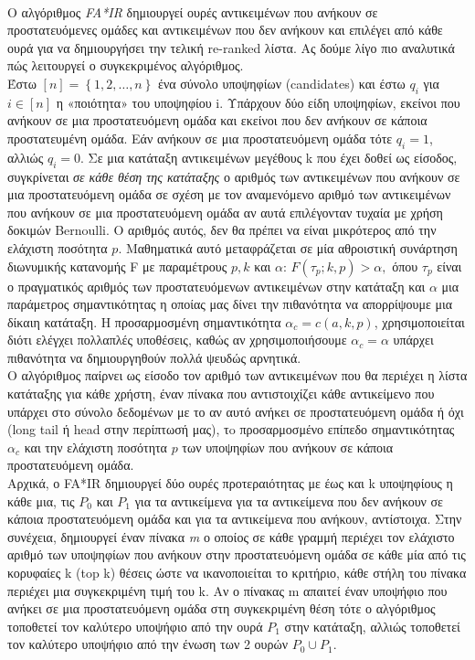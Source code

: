 \\
Ο αλγόριθμος \textit{FA*IR} \cite{zehlikeFAIRFair2017} δημιουργεί ουρές αντικειμένων που ανήκουν σε προστατευόμενες ομάδες και αντικειμένων που δεν ανήκουν και επιλέγει από κάθε ουρά για να δημιουργήσει την τελική re-ranked λίστα. Ας δούμε λίγο πιο αναλυτικά πώς λειτουργεί ο συγκεκριμένος αλγόριθμος.\\ Έστω $ \left[ n \right] =\left\lbrace 1, 2, \dots ,n \right\rbrace  $ ένα σύνολο υποψηφίων (candidates) και έστω $ q_i $ για $ i \in \left[n \right]  $ η «ποιότητα» του υποψηφίου i. Υπάρχουν δύο είδη υποψηφίων, εκείνοι που ανήκουν σε μια προστατευόμενη ομάδα και εκείνοι που δεν ανήκουν σε κάποια προστατευμένη ομάδα. Εάν ανήκουν σε μια προστατευόμενη ομάδα τότε $ q_i = 1 $, αλλιώς  $ q_i = 0 $. Σε μια κατάταξη αντικειμένων μεγέθους k που έχει δοθεί ως είσοδος, συγκρίνεται \textit{σε κάθε θέση της κατάταξης} ο αριθμός των αντικειμένων που ανήκουν σε μια προστατευόμενη ομάδα σε σχέση με τον αναμενόμενο αριθμό των αντικειμένων που ανήκουν σε μια προστατευόμενη ομάδα αν αυτά επιλέγονταν τυχαία με χρήση δοκιμών Bernoulli. Ο αριθμός αυτός, δεν θα πρέπει να είναι μικρότερος από την ελάχιστη ποσότητα $ p $. Μαθηματικά αυτό μεταφράζεται σε μία αθροιστική συνάρτηση διωνυμικής κατανομής F με παραμέτρους $  p, k $ και $ α $:
$ F(\tau _p; k, p) > \alpha , $ όπου $ \tau _p  $ είναι ο πραγματικός αριθμός των προστατευόμενων αντικειμένων στην κατάταξη και $ \alpha $ μια παράμετρος σημαντικότητας η οποίας μας δίνει την πιθανότητα να απορρίψουμε μια δίκαιη κατάταξη. Η προσαρμοσμένη σημαντικότητα $ \alpha_c = c\left(a, k, p \right) $, χρησιμοποιείται διότι ελέγχει πολλαπλές υποθέσεις, καθώς αν χρησιμοποιήσουμε $ \alpha_c = \alpha $ υπάρχει πιθανότητα να δημιουργηθούν πολλά ψευδώς αρνητικά.\\
Ο αλγόριθμος παίρνει ως είσοδο τον αριθμό των αντικειμένων που θα περιέχει η λίστα κατάταξης για κάθε χρήστη, έναν πίνακα που αντιστοιχίζει κάθε αντικείμενο που υπάρχει στο σύνολο δεδομένων με το αν αυτό ανήκει σε προστατευόμενη ομάδα ή όχι (long tail ή head στην περίπτωσή μας), τo προσαρμοσμένο επίπεδο σημαντικότητας $ \alpha_c $ και την ελάχιστη ποσότητα $ p $ των υποψηφίων που ανήκουν σε κάποια προστατευόμενη ομάδα. \\
Αρχικά, ο FA*IR δημιουργεί δύο ουρές προτεραιότητας με έως και k υποψηφίους η κάθε μια, τις $ P_0 $ και $ P_1 $ για τα αντικείμενα για τα αντικείμενα που δεν ανήκουν σε κάποια προστατευόμενη ομάδα και για τα αντικείμενα που ανήκουν, αντίστοιχα. Στην συνέχεια, δημιουργεί έναν πίνακα \textit{m} ο οποίος σε κάθε γραμμή περιέχει τον ελάχιστο αριθμό των υποψηφίων που ανήκουν στην προστατευόμενη ομάδα σε κάθε μία από τις κορυφαίες k (top k) θέσεις ώστε να ικανοποιείται το κριτήριο, κάθε στήλη του πίνακα περιέχει μια συγκεκριμένη τιμή του k. Αν ο πίνακας m απαιτεί έναν υποψήφιο που ανήκει σε μια προστατευόμενη ομάδα  στη συγκεκριμένη θέση τότε ο αλγόριθμος τοποθετεί τον καλύτερο υποψήφιο από την ουρά $ P_1 $ στην κατάταξη, αλλιώς τοποθετεί τον καλύτερο υποψήφιο από την ένωση των 2 ουρών $ P_0 \cup P_1 $.\\

